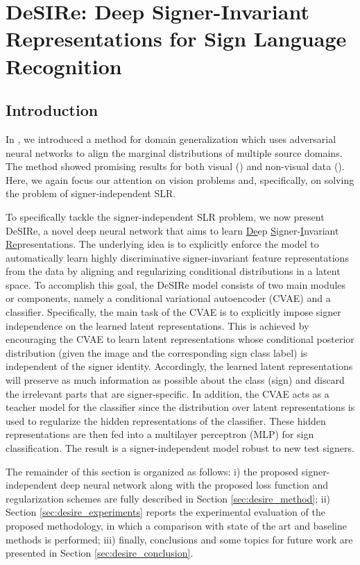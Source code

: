 \section{DeSIRe: Deep Signer-Invariant Representations for Sign Language Recognition}
\label{sec:desire}

\subsection{Introduction}
In , we introduced a method for domain generalization which uses adversarial neural networks to align the marginal distributions of multiple source domains. The method showed promising results for both visual () and non-visual data (). Here, we again focus our attention on vision problems and, specifically, on solving the problem of signer-independent SLR.

To specifically tackle the signer-independent SLR problem, we now present DeSIRe, a novel deep neural network that aims to learn \underline{De}ep \underline{S}igner-\underline{I}nvariant \underline{Re}presentations. The underlying idea is to explicitly enforce the model to automatically learn highly discriminative signer-invariant feature representations from the data by aligning and regularizing conditional distributions in a latent space. To accomplish this goal, the DeSIRe model consists of two main modules or components, namely a conditional variational autoencoder (CVAE) and a classifier. Specifically, the main task of the CVAE is to explicitly impose signer independence on the learned latent representations. This is achieved by encouraging the CVAE to learn latent representations whose conditional posterior distribution (given the image and the corresponding sign class label) is independent of the signer identity. Accordingly, the learned latent representations will preserve as much information as possible about the class (sign) and discard the irrelevant parts that are signer-specific. In addition, the CVAE acts as a teacher model for the classifier since the distribution over latent representations is used to regularize the hidden representations of the classifier. These hidden representations are then fed into a multilayer perceptron (MLP) for sign classification. The result is a signer-independent model robust to new test signers.

The remainder of this section is organized as follows: i) the proposed signer-independent deep neural network along with the proposed loss function and regularization schemes are fully described in Section \ref{sec:desire_method}; ii) Section \ref{sec:desire_experiments} reports the experimental evaluation of the proposed methodology, in which a comparison with state of the art and baseline methods is performed; iii) finally, conclusions and some topics for future work are presented in Section \ref{sec:desire_conclusion}.

